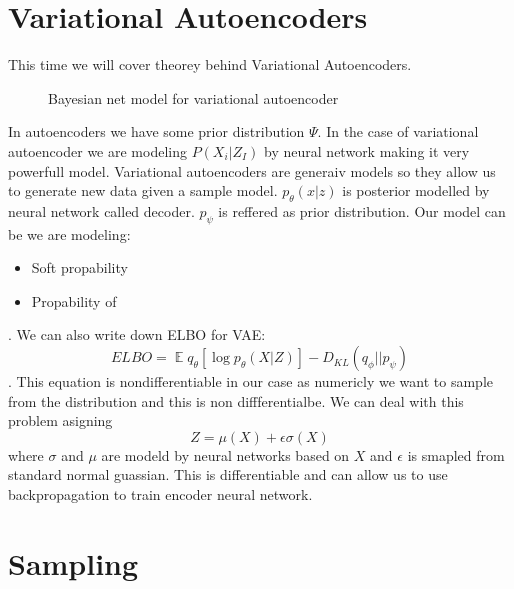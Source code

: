 \documentclass[12pt,a4paper]{article}
\DeclareMathOperator{\EX}{\mathbb{E}}%
\begin{document}
\section{Variational Autoencoders}
This time we will cover theorey behind Variational Autoencoders.
\begin{figure}[H]\label{var_enc}
    \centering
    \caption{Bayesian net model for variational autoencoder}
\end{figure}
In autoencoders we have some prior distribution $\Psi$. In the case of variational autoencoder we are modeling $P(X_i|Z_I)$ by neural network making it very powerfull model. Variational autoencoders
are generaiv models so they allow us to generate new data given a sample model. $p_\theta(x|z)$ is posterior modelled by neural network called  decoder. $p_\psi$ is reffered as
prior distribution.
Our model can be we are modeling:
\begin{itemize}
    \item Soft propability 
    \item Propability of 
\end{itemize}. We can also write down ELBO for VAE:
\begin{equation}
ELBO=\EX{q_\theta} [\log{p_\theta(X|Z)}]-D_{KL}(q_\phi||p_\psi)
\end{equation}. This equation is nondifferentiable in our case as numericly we want to sample from the distribution and this is non diffferentialbe. We can deal with this problem
asigning 
\begin{equation}
    Z=\mu(X)+\epsilon \sigma(X)
\end{equation}
where $\sigma$ and $\mu$ are modeld by neural networks based on $X$ and $\epsilon$ is smapled from standard normal guassian. This is differentiable and can allow us to use backpropagation to 
train encoder neural network.

\section{Sampling}
\end{document}
